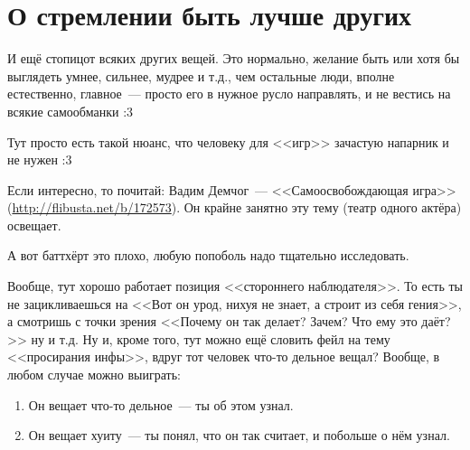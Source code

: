 \documentclass[a4paper,14pt,oneside]{memoir}
\begin{document}
\section{О стремлении быть лучше других}

\medskip
И ещё стопицот всяких других вещей. Это нормально, желание быть или хотя бы выглядеть умнее, сильнее, мудрее и т.д., чем остальные люди, вполне естественно, главное~--- просто его в нужное русло направлять, и не вестись на всякие самообманки :3 

Тут просто есть такой нюанс, что человеку для <<игр>> зачастую напарник и не нужен :3 

Если интересно, то почитай: Вадим Демчог~--- <<Самоосвобождающая игра>> (\url{http://flibusta.net/b/172573}). Он крайне занятно эту тему (театр одного актёра) освещает. 

А вот баттхёрт это плохо, любую попоболь надо тщательно исследовать.
 
Вообще, тут хорошо работает позиция <<стороннего наблюдателя>>. То есть ты не зацикливаешься на <<Вот он урод, нихуя не знает, а строит из себя гения>>, а смотришь с точки зрения <<Почему он так делает? Зачем? Что ему это даёт?>> ну и т.д. Ну и, кроме того, тут можно ещё словить фейл на тему <<просирания инфы>>, вдруг тот человек что-то дельное вещал? Вообще, в любом случае можно выиграть:
\begin{enumerate}
\item Он вещает что-то дельное~--- ты об этом узнал.
\item Он вещает хуиту~--- ты понял, что он так считает, и побольше о нём узнал. 
\end{enumerate}
\end{document}
